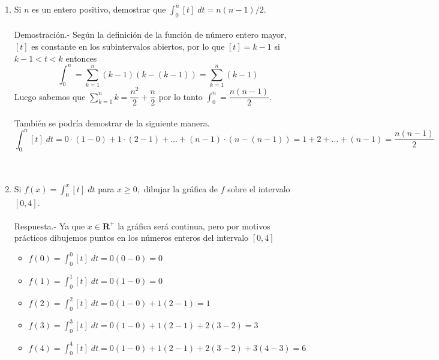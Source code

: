 \begin{enumerate}
\begin{enumerate}[\bfseries (a)]
	\item Si $n$ es un entero positivo, demostrar que $\displaystyle\int_{0}^{n} [t] \; dt = n(n-1)/2$.\\\\
	    Demostración.-\; Según la definición de la función de número entero mayor, $[t]$ es constante en los subintervalos abiertos, por lo que $[t]=k-1$ si $k-1<t<k$ entonces  $$\displaystyle\int_{0}^{n} = \sum_{k=1}^{n} (k-1)(k-(k-1)) = \sum_{k=1}^{n} (k-1)$$ Luego sabemos que $\sum\limits_{k=1}^{n} k = \dfrac{n^2}{2}+\dfrac{n}{2}$ por lo tanto $\displaystyle\int_{0}^{n}=\dfrac{n(n-1)}{2}$. \\\\
	    También se podría demostrar de la siguiente manera.
	    $$\displaystyle\int_{0}^{n} [t] \; dt = 0\cdot (1-0) + 1\cdot (2-1) + ... + (n-1)\cdot (n-(n-1))=1+2+...+(n-1)=\dfrac{n(n-1)}{2}$$\\\\

	\item Si $f(x)=\displaystyle\int_{0}^{x} [t] \; dt$ para $x\geq 0,$ dibujar la gráfica de $f$ sobre el intervalo $[0,4]$.\\\\
	    Respuesta.-\; Ya que $x \in \mathbf{R}^+$ la gráfica será continua, pero por motivos prácticos dibujemos puntos en los números enteros del intervalo $[0,4]$
	    \begin{itemize}
		\item $f(0)=\displaystyle\int_{0}^{0} [t] \; dt = 0(0-0)=0$
		\item $f(1)=\displaystyle\int_{0}^{1} [t] \; dt = 0(1-0)=0$
		\item $f(2)=\displaystyle\int_{0}^{2} [t] \; dt = 0(1-0) + 1(2-1)=1$
		\item $f(3)=\displaystyle\int_{0}^{3} [t] \; dt = 0(1-0) + 1(2-1) + 2(3-2) = 3$
		\item $f(4)=\displaystyle\int_{0}^{4} [t] \; dt = 0(1-0) + 1(2-1) + 2(3-2) + 3(4-3) = 6$\\\\
	    \end{itemize}
		\begin{center}
		\end{center}
		\vspace{1cm}


\end{enumerate}
\end{enumerate}
